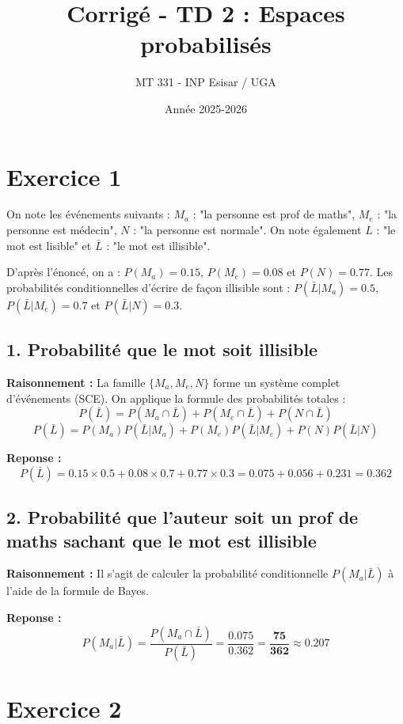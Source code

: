 \documentclass[11pt,a4paper]{article}
\title{Corrigé - TD 2 : Espaces probabilisés}
\author{MT 331 - INP Esisar / UGA}
\date{Année 2025-2026}
\begin{document}
\maketitle

\section*{Exercice 1}

On note les événements suivants : 
$M_a$ : "la personne est prof de maths", 
$M_e$ : "la personne est médecin", 
$N$ : "la personne est normale".
On note également $L$ : "le mot est lisible" et $\bar{L}$ : "le mot est illisible".

D'après l'énoncé, on a : $P(M_a) = 0.15$, $P(M_e) = 0.08$ et $P(N) = 0.77$.
Les probabilités conditionnelles d'écrire de façon illisible sont : $P(\bar{L}|M_a) = 0.5$, $P(\bar{L}|M_e) = 0.7$ et $P(\bar{L}|N) = 0.3$.

\subsection*{1. Probabilité que le mot soit illisible}

\textbf{Raisonnement :} La famille $\{M_a, M_e, N\}$ forme un système complet d'événements (SCE). On applique la formule des probabilités totales :
$$P(\bar{L}) = P(M_a \cap \bar{L}) + P(M_e \cap \bar{L}) + P(N \cap \bar{L})$$
$$P(\bar{L}) = P(M_a)P(\bar{L}|M_a) + P(M_e)P(\bar{L}|M_e) + P(N)P(\bar{L}|N)$$

\textbf{Reponse :} 
$$P(\bar{L}) = 0.15 \times 0.5 + 0.08 \times 0.7 + 0.77 \times 0.3 = 0.075 + 0.056 + 0.231 = \mathbf{0.362}$$

\subsection*{2. Probabilité que l'auteur soit un prof de maths sachant que le mot est illisible}

\textbf{Raisonnement :} Il s'agit de calculer la probabilité conditionnelle $P(M_a|\bar{L})$ à l'aide de la formule de Bayes.

\textbf{Reponse :} 
$$P(M_a|\bar{L}) = \frac{P(M_a \cap \bar{L})}{P(\bar{L})} = \frac{0.075}{0.362} = \mathbf{\frac{75}{362} \approx 0.207}$$

\hrulefill

\section*{Exercice 2}
\end{document}
